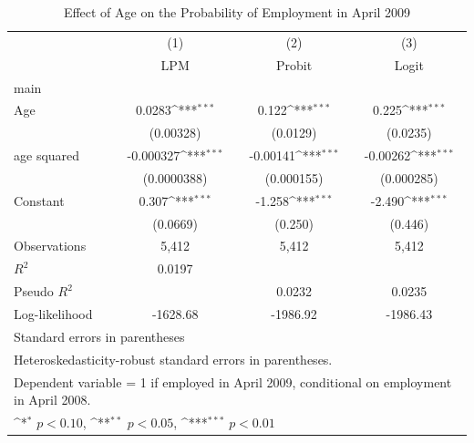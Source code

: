 \begin{table}[htbp]\centering
\def\sym#1{\ifmmode^{#1}\else\(^{#1}\)\fi}
\caption{Effect of Age on the Probability of Employment in April 2009\label{tab:prob1-bcd}}
\begin{tabular}{l*{3}{c}}
\toprule
                    &\multicolumn{1}{c}{(1)}&\multicolumn{1}{c}{(2)}&\multicolumn{1}{c}{(3)}\\
                    &\multicolumn{1}{c}{LPM}&\multicolumn{1}{c}{Probit}&\multicolumn{1}{c}{Logit}\\
\midrule
main                &                     &                     &                     \\
Age                 &      0.0283\sym{***}&       0.122\sym{***}&       0.225\sym{***}\\
                    &   (0.00328)         &    (0.0129)         &    (0.0235)         \\
\addlinespace
age squared         &   -0.000327\sym{***}&    -0.00141\sym{***}&    -0.00262\sym{***}\\
                    & (0.0000388)         &  (0.000155)         &  (0.000285)         \\
\addlinespace
Constant            &       0.307\sym{***}&      -1.258\sym{***}&      -2.490\sym{***}\\
                    &    (0.0669)         &     (0.250)         &     (0.446)         \\
\midrule
Observations        &       5,412         &       5,412         &       5,412         \\
$R^2$               &      0.0197         &                     &                     \\
Pseudo $R^2$        &                     &      0.0232         &      0.0235         \\
Log-likelihood      &    -1628.68         &    -1986.92         &    -1986.43         \\
\bottomrule
\multicolumn{4}{l}{\footnotesize Standard errors in parentheses}\\
\multicolumn{4}{l}{\footnotesize Heteroskedasticity-robust standard errors in parentheses.}\\
\multicolumn{4}{l}{\footnotesize Dependent variable = 1 if employed in April 2009, conditional on employment in April 2008.}\\
\multicolumn{4}{l}{\footnotesize \sym{*} \(p<0.10\), \sym{**} \(p<0.05\), \sym{***} \(p<0.01\)}\\
\end{tabular}
\end{table}
